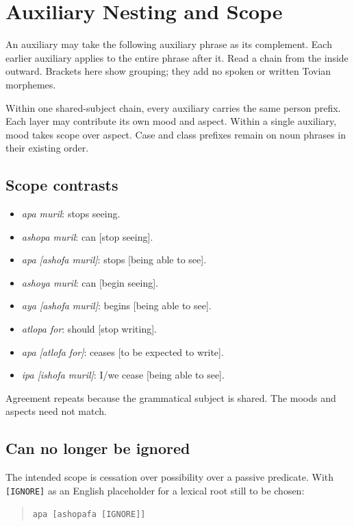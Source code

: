 \section{Auxiliary Nesting and Scope}

An auxiliary may take the following auxiliary phrase as its complement. Each earlier auxiliary applies to the entire phrase after it. Read a chain from the inside outward. Brackets here show grouping; they add no spoken or written Tovian morphemes.

Within one shared-subject chain, every auxiliary carries the same person prefix. Each layer may contribute its own mood and aspect. Within a single auxiliary, mood takes scope over aspect. Case and class prefixes remain on noun phrases in their existing order.

\subsection*{Scope contrasts}

\begin{itemize}
\item \textit{apa muril}: stops seeing.
\item \textit{ashopa muril}: can [stop seeing].
\item \textit{apa [ashofa muril]}: stops [being able to see].
\item \textit{ashoya muril}: can [begin seeing].
\item \textit{aya [ashofa muril]}: begins [being able to see].
\item \textit{atlopa for}: should [stop writing].
\item \textit{apa [atlofa for]}: ceases [to be expected to write].
\item \textit{ipa [ishofa muril]}: I/we cease [being able to see].
\end{itemize}

Agreement repeats because the grammatical subject is shared. The moods and aspects need not match.

\subsection*{Can no longer be ignored}

The intended scope is cessation over possibility over a passive predicate. With \texttt{[IGNORE]} as an English placeholder for a lexical root still to be chosen:

\begin{quote}
\texttt{apa [ashopafa [IGNORE]]}
\end{quote}

